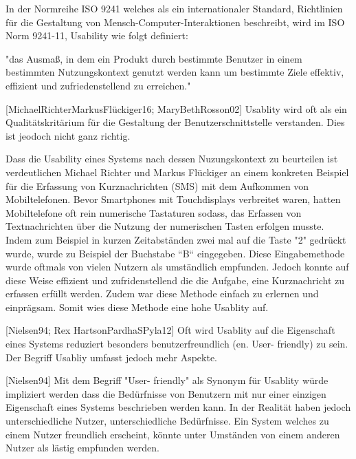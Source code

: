 In der Normreihe ISO 9241 welches als ein internationaler Standard, Richtlinien für die Gestaltung von Mensch-Computer-Interaktionen beschreibt, wird im ISO Norm 9241-11,  Usability wie folgt definiert:

"das Ausmaß, in dem ein Produkt durch bestimmte Benutzer in einem bestimmten Nutzungskontext genutzt werden kann um bestimmte Ziele effektiv, effizient und zufriedenstellend zu erreichen."

[MichaelRichterMarkusFlückiger16; MaryBethRosson02] Usablity wird  oft als ein Qualitätskritärium für die Gestaltung der Benutzerschnittstelle verstanden. Dies ist jeodoch nicht ganz richtig.

Dass die Usability eines Systems nach dessen Nuzungskontext zu beurteilen ist verdeutlichen Michael Richter und Markus Flückiger an einem konkreten Beispiel für die Erfassung 
von Kurznachrichten (SMS) mit dem Aufkommen von Mobiltelefonen.  Bevor Smartphones mit Touchdisplays verbreitet waren, hatten Mobiltelefone oft rein numerische Tastaturen sodass, das Erfassen 
von Textnachrichten über die Nutzung der numerischen Tasten erfolgen musste. Indem zum Beispiel in kurzen Zeitabständen zwei mal auf die Taste "2" gedrückt wurde, wurde zu Beispiel der Buchstabe ``B`` eingegeben. 
Diese Eingabemethode wurde oftmals von vielen Nutzern als umständlich empfunden. Jedoch konnte auf diese Weise effizient und zufridenstellend die die Aufgabe, eine Kurznachricht zu erfassen erfüllt werden. 
Zudem war diese Methode einfach zu erlernen und einprägsam. Somit wies diese Methode eine hohe Usablity auf. 

[Nielsen94; Rex HartsonPardhaSPyla12] Oft wird Usablity auf die Eigenschaft eines Systems reduziert besonders benutzerfreundlich (en. User- friendly) zu sein. Der Begriff Usabliy umfasst jedoch mehr Aspekte. 

[Nielsen94] Mit dem Begriff "User- friendly" als Synonym für Usablity würde impliziert werden dass die Bedürfnisse von Benutzern mit nur einer einzigen Eigenschaft eines Systems beschrieben werden kann. 
In der Realität haben jedoch unterschiedliche Nutzer, unterschiedliche Bedürfnisse. Ein System welches zu einem Nutzer freundlich erscheint, könnte unter Umständen von einem anderen Nutzer als lästig empfunden werden.

